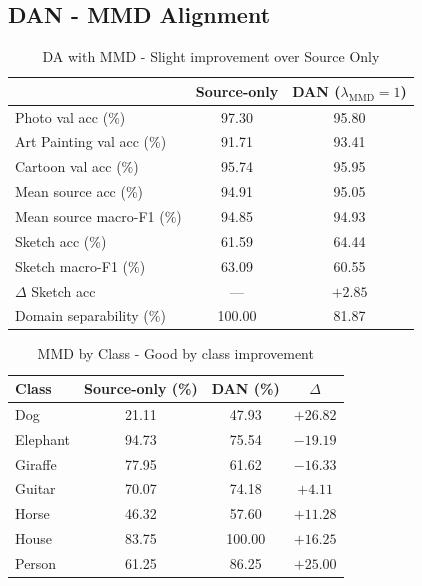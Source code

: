 \documentclass{article}
\begin{document}
\subsection{DAN - MMD Alignment}

\begin{table}[H]
  \caption{DA with MMD - Slight improvement over Source Only}
  \label{tab:dan}
  \centering
  \begin{tabular}{lcc}
    \toprule
    & Source-only & DAN ($\lambda_{\mathrm{MMD}}=1$) \\
    \midrule
    Photo val acc (\%)          & 97.30 & 95.80 \\
    Art Painting val acc (\%)   & 91.71 & 93.41 \\
    Cartoon val acc (\%)        & 95.74 & 95.95 \\
    \midrule
    Mean source acc (\%)        & 94.91 & 95.05 \\
    Mean source macro-F1 (\%)   & 94.85 & 94.93 \\
    \midrule
    Sketch acc (\%)             & 61.59 & 64.44 \\
    Sketch macro-F1 (\%)        & 63.09 & 60.55 \\
    $\Delta$ Sketch acc         & ---   & $+2.85$ \\
    Domain separability (\%)    & 100.00 & 81.87 \\
    \bottomrule
  \end{tabular}
\end{table}

\begin{table}[H]
  \caption{MMD by Class - Good by class improvement}
  \label{tab:dan-per-class}
  \centering
  \begin{tabular}{lccc}
    \toprule
    Class & Source-only (\%) & DAN (\%) & $\Delta$ \\
    \midrule
    Dog      & 21.11 &  47.93 & $+26.82$ \\
    Elephant & 94.73 &  75.54 & $-19.19$ \\
    Giraffe  & 77.95 &  61.62 & $-16.33$ \\
    Guitar   & 70.07 &  74.18 & $+4.11$ \\
    Horse    & 46.32 &  57.60 & $+11.28$ \\
    House    & 83.75 & 100.00 & $+16.25$ \\
    Person   & 61.25 &  86.25 & $+25.00$ \\
    \bottomrule
  \end{tabular}
\end{table}
\end{document}
